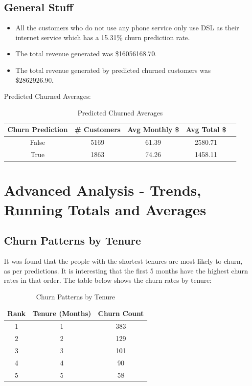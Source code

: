 \documentclass{article}
\theoremstyle{mytheoremstyle}
\theoremstyle{mytheoremstyle}
\theoremstyle{myproblemstyle}
\begin{document}
\subsection{General Stuff}
\begin{itemize}
    \item All the customers who do not use any phone service only use DSL as their internet service which has a 15.31\% churn prediction rate.
    \item The total revenue generated was \$16056168.70.
    \item The total revenue generated by predicted churned customers was \$2862926.90.
\end{itemize}

Predicted Churned Averages:

\begin{table}[H]
    \centering
    \begin{tabular}{|c|c|c|c|c|}
        \hline
        \textbf{Churn Prediction} & \textbf{\# Customers} & \textbf{Avg Monthly \$} & \textbf{Avg Total \$} \\
        \hline
        False & 5169 & 61.39 & 2580.71 \\
        True & 1863 & 74.26 & 1458.11 \\
        \hline
    \end{tabular}
    \caption{Predicted Churned Averages}
\end{table}


\newpage
\section{Advanced Analysis - Trends, Running Totals and Averages}
\subsection{Churn Patterns by Tenure}
It was found that the people with the shortest tenures are most likely to churn, as per predictions. It is interesting that the first 5 months have the highest churn rates in that order. The table below shows the churn rates by tenure:

\begin{table}[H]
    \centering
    \begin{tabular}{|c|c|c|}
        \hline
        \textbf{Rank} & \textbf{Tenure (Months)} & \textbf{Churn Count} \\ 
        \hline
        1 & 1 & 383 \\
        2 & 2 & 129 \\
        3 & 3 & 101 \\
        4 & 4 & 90 \\
        5 & 5 & 58 \\
        \hline
    \end{tabular}    
    \caption{Churn Patterns by Tenure}
\end{table}
\end{document}
